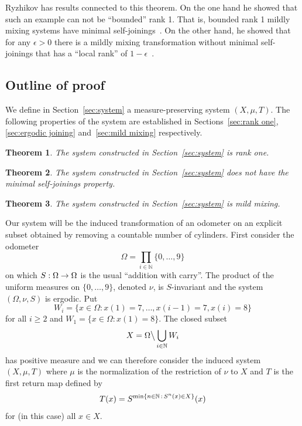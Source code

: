 \documentclass[10pt]{amsart}
\newtheorem{theo}{Theorem}[section]
\theoremstyle{definition}\newtheorem{defi}[theo]{Definition}\newtheorem{rema}[theo]{Remark}\newtheorem{exam}[theo]{Example}\newtheorem{exem}[theo]{Example}\newtheorem{nota}[theo]{Notation}
\newcommand{\N}{\mathbb{N}}
\let\originalleft\left
\let\originalright\right
\renewcommand{\left}{\mathopen{}\mathclose\bgroup\originalleft}
\renewcommand{\right}{\aftergroup\egroup\originalright}
\renewcommand*{\to}{\mathchoice{\longrightarrow}{\rightarrow}{\rightarrow}{\rightarrow}}
\begin{document}
Ryzhikov has results connected to this theorem. On the one hand he showed that such an example can not be ``bounded'' rank 1. That is, bounded rank 1 mildly mixing systems have minimal self-joinings~\cite{MR3235793}. On the other hand, he showed that for any $\epsilon>0$ there is a mildly mixing transformation without minimal self-joinings that has a ``local rank'' of $1-\epsilon$~\cite{Ryzarx}.



\subsection{Outline of proof}

We define in Section~\ref{sec:system} a measure-preserving system $(X,\mu,T)$. The following properties of the system are established in Sections~\ref{sec:rank one}, \ref{sec:ergodic joining} and~\ref{sec:mild mixing} respectively.

\begin{theo}\label{thm:rank one}
The system constructed in Section~\ref{sec:system} is rank one.
\end{theo}

\begin{theo}\label{thm:ergodic joining}
The system constructed in Section~\ref{sec:system} does not have the minimal self-joinings property.
\end{theo}

\begin{theo}\label{thm:mild mixing}
The system constructed in Section~\ref{sec:system} is mild mixing.
\end{theo}

Our system will be the induced transformation of an odometer on an explicit subset obtained by removing a countable number of cylinders. First consider the odometer
\[
\Omega = \prod_{i \in \N} \{0, \dots, 9 \}
\]
on which $S : \Omega \to \Omega$ is the usual ``addition with carry''. The product of the uniform measures on $\{0,\dots,9\}$, denoted $\nu$, is $S$-invariant and the system $(\Omega, \nu, S)$ is ergodic. Put
\[
W_i = \{ x \in \Omega : x(1) = 7,\dots, x(i-1) = 7, x(i) = 8 \}
\]
for all $i \ge 2$ and $W_1 = \{ x \in \Omega : x(1) = 8 \}$. The closed subset
\[
X = \Omega \big\backslash \bigcup_{i \in \N} W_i
\]
has positive measure and we can therefore consider the induced system $(X,\mu,T)$ where $\mu$ is the normalization of the restriction of $\nu$ to $X$ and $T$ is the first return map defined by
\[
T(x) = S^{\min \left\{ n \in \N\, :\, S^n(x) \in X\right\}}(x)
\]
for (in this case) all $x \in X$.
\end{document}
